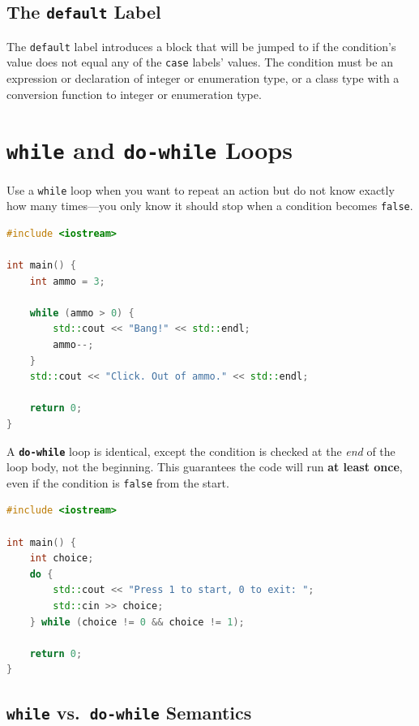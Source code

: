 \subsection{The \texttt{default} Label}

The \texttt{default} label introduces a block that will be jumped to if the condition's value does not equal any of the \texttt{case} labels' values. The condition must be an expression or declaration of integer or enumeration type, or a class type with a conversion function to integer or enumeration type.

\section{\texttt{while} and \texttt{do-while} Loops}
\label{sec:while-loops}

Use a \texttt{while} loop when you want to repeat an action but do not know exactly how many times---you only know it should stop when a condition becomes \texttt{false}.

\begin{lstlisting}[language=C++, caption={While loop}]
#include <iostream>

int main() {
    int ammo = 3;

    while (ammo > 0) {
        std::cout << "Bang!" << std::endl;
        ammo--;
    }
    std::cout << "Click. Out of ammo." << std::endl;

    return 0;
}
\end{lstlisting}

A \textbf{\texttt{do-while}} loop is identical, except the condition is checked at the \textit{end} of the loop body, not the beginning. This guarantees the code will run \textbf{at least once}, even if the condition is \texttt{false} from the start.

\begin{lstlisting}[language=C++, caption={Do-while loop for input validation}]
#include <iostream>

int main() {
    int choice;
    do {
        std::cout << "Press 1 to start, 0 to exit: ";
        std::cin >> choice;
    } while (choice != 0 && choice != 1);

    return 0;
}
\end{lstlisting}

\subsection{\texttt{while} vs.\ \texttt{do-while} Semantics}

